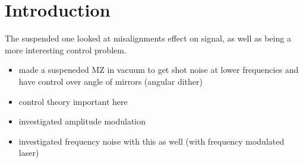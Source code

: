 \section{Introduction}
The suspended one looked at misalignments effect on signal, as well as being a more interesting control problem.
\begin{itemize}
	\item made a suspeneded MZ in vacuum to get shot noise at lower frequencies and have control over angle of mirrors (angular dither)
	\item control theory important here
	\item investigated amplitude modulation
	\item investigated frequency noise with this as well (with frequency modulated laser)
\end{itemize}
